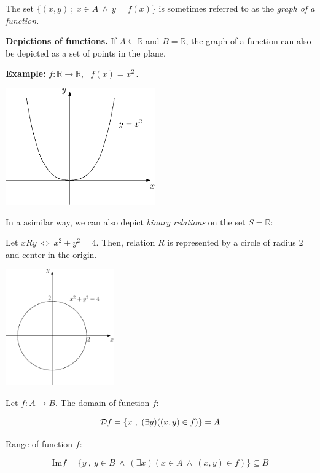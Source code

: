 \documentclass[11pt,paper=b5,footinclude,headinclude]{scrbook} %
\def\inn {{~\wedge~}}
\def\cee {{~\Leftrightarrow~}}
\theoremstyle{remark}
\theoremstyle{definition} %
\theoremstyle{theorem} %
\begin{document}
\bigskip
The set $\{(x,y)~;~x\in A\inn y = f(x)\}$ is sometimes referred to as the {\em graph of a function.}

\bigskip
\textbf{ Depictions of functions.}
If $A\subseteq \mathbb{R}$ and $B = \mathbb{R}$, the graph of a function can also be depicted as
a set of points in the plane.

\textbf{ Example:} $f:\mathbb{R}\to \mathbb{R},~~~f(x) = x^2\,.$
\begin{center}
\includegraphics[height=50mm]{yx2.eps}
\end{center}

\medskip

In a asimilar way, we can also depict {\em binary relations} on the set $S =\mathbb{R}$:

Let $xRy \cee x^2+y^2 = 4$.
Then, relation $R$ is represented by a circle of radius $2$ and center in the origin.

\begin{center}
\includegraphics[height=50mm]{x2+y2=4.eps}
\end{center}

\bigskip
Let $f:A\to B$.
The domain of function $f$:

$${\cal D}f = \{x~,~(\exists y)((x,y)\in f)\} = A$$

Range of function $f$:

$$\textrm{Im}f = \{y~,~y\in B\inn (\exists x)(x\in A\inn (x,y)\in f)\} \subseteq B$$

\end{document}
